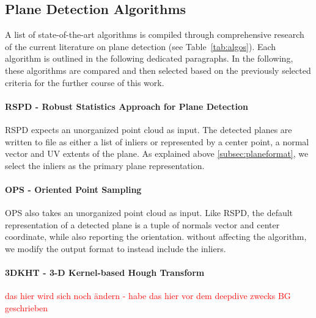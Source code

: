 \documentclass[main.tex]{subfiles}
\begin{document}
\subsection{Plane Detection Algorithms}


A list of state-of-the-art algorithms is compiled through comprehensive research of the current literature on plane detection (see Table~\ref{tab:algos}).
Each algorithm is outlined in the following dedicated paragraphs. In the following, these algorithms are compared and then selected based on the previously selected criteria for the further course of this work.

\paragraph{RSPD - Robust Statistics Approach for Plane Detection}
RSPD expects an unorganized point cloud as input. The detected planes are written to file as either a list of inliers or
represented by a center point, a normal vector and UV extents of the plane.
As explained above \ref{subsec:planeformat}, we select the inliers as the primary plane representation.

\paragraph{OPS - Oriented Point Sampling}
OPS also takes an unorganized point cloud as input. Like RSPD, the default representation of a detected plane is
a tuple of normals vector and center coordinate, while also reporting the orientation.
without affecting the algorithm, we modify the output format to instead include the inliers.

\paragraph{3DKHT - 3-D Kernel-based Hough Transform}

\textcolor{red}{das hier wird sich noch ändern - habe das hier vor dem deepdive zwecks BG geschrieben}
\end{document}
